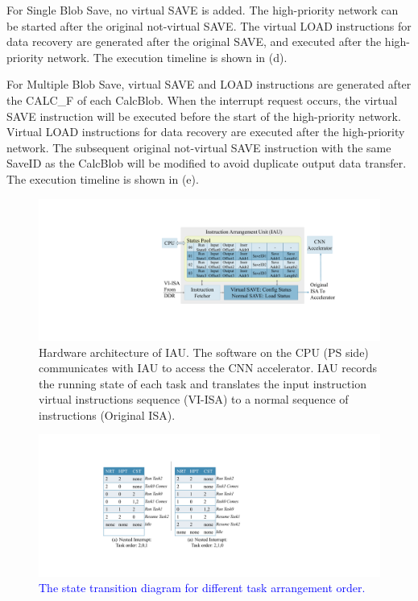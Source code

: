 For Single Blob Save, no virtual SAVE is added. The high-priority network can be started after the original not-virtual SAVE. The virtual LOAD instructions for data recovery are generated after the original SAVE, and executed after the high-priority network. The execution timeline is shown in (d).

For Multiple Blob Save, virtual SAVE and LOAD instructions are generated after the CALC\_F of each CalcBlob. When the interrupt request occurs, the virtual SAVE instruction will be executed before the start of the high-priority network. Virtual LOAD instructions for data recovery are executed after the high-priority network. The subsequent original not-virtual SAVE instruction with the same SaveID as the CalcBlob will be modified to avoid duplicate output data transfer. The execution timeline is shown in (e).


\begin{figure}[t]
	\centering
	\includegraphics[width=0.99\linewidth]{fig/iau.pdf}
	\vspace{-6mm}
	\caption{Hardware architecture of IAU. The software on the CPU (PS side) communicates with IAU to access the CNN accelerator. IAU records the running state of each task and translates the input instruction virtual instructions sequence (VI-ISA) to a normal sequence of instructions (Original ISA).
	}
	\label{fig:IAU}
\end{figure}

\begin{figure}[t]
	\centering
	\includegraphics[width=0.8\linewidth]{fig/nestedinter.pdf}
	\vspace{-0mm}
	\caption{
		\textcolor{blue}{The state transition diagram for different task arrangement order.
		}
	}
	\label{fig:nestedinter}
\end{figure}

